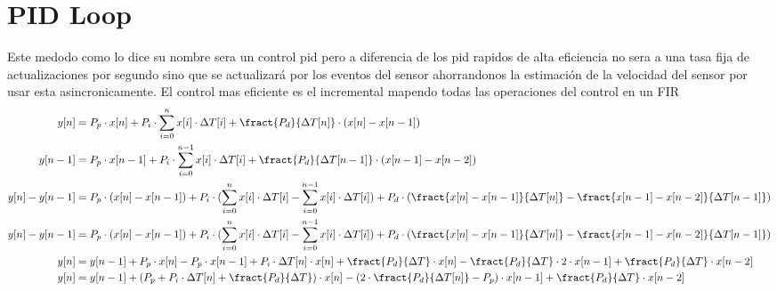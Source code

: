 \section{PID Loop}
Este medodo como lo dice su nombre sera un control pid pero a diferencia de los pid rapidos de alta eficiencia no sera a una tasa fija de actualizaciones por segundo sino que se actualizará por los eventos del sensor ahorrandonos la estimación de la velocidad del sensor por usar esta asincronicamente.
El control mas eficiente es el incremental mapendo todas las operaciones del control en un FIR
\begin{align*}
    y[n] &= P_p \cdot x[n] + P_i \cdot \sum_{i = 0}^{n} x[i]  \cdot \Delta T[i]+ \fract{P_d}{\Delta T[n]} \cdot (x[n]-x[n-1]) \\
    y[n-1] &= P_p \cdot x[n-1] + P_i \cdot \sum_{i = 0}^{n-1} x[i] \cdot \Delta T[i] + \fract{P_d}{\Delta T[n-1]} \cdot (x[n-1]-x[n-2]) \\
    y[n] - y[n-1] &= P_p \cdot ( x[n] - x[n-1] ) + P_i \cdot (\sum_{i = 0}^{n} x[i] \cdot \Delta T[i]- \sum_{i = 0}^{n-1} x[i] \cdot \Delta T[i]) + P_d \cdot (\fract{x[n]-x[n-1]}{\Delta T[n]}-\fract{x[n-1]-x[n-2]}{\Delta T[n-1]}) \\
    y[n] - y[n-1] &= P_p \cdot ( x[n] - x[n-1] ) + P_i \cdot (\sum_{i = 0}^{n} x[i] \cdot \Delta T[i]- \sum_{i = 0}^{n-1} x[i] \cdot \Delta T[i]) + P_d \cdot (\fract{x[n]-x[n-1]}{\Delta T[n]}-\fract{x[n-1]-x[n-2]}{\Delta T[n-1]}) \\
    y[n] &= y[n-1] + P_p \cdot  x[n] - P_p \cdot x[n-1]  + P_i \cdot \Delta T[n] \cdot x[n] + \fract{P_d}{\Delta T } \cdot x[n] - \fract{P_d}{\Delta T } \cdot 2 \cdot x[n-1] + \fract{P_d}{\Delta T } \cdot x[n-2] \\
    y[n] &= y[n-1] + (P_p  + P_i \cdot \Delta T[n] + \fract{P_d}{\Delta T } ) \cdot x[n] - (2 \cdot \fract{P_d}{\Delta T[n] } - P_p ) \cdot x[n-1] + \fract{P_d}{\Delta T } \cdot x[n-2] \\
\end{align*}

